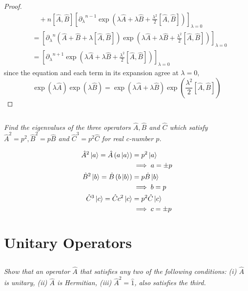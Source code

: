 \documentclass{article}
\begin{document}
\begin{proof}
\begin{align*}
        & \quad+n[\hat{A}, \hat{B}]\left[{\partial_\lambda}^{n-1 } \exp \left(\lambda \hat{A}+\lambda \hat{B}+\frac{\lambda^{2}}{2}[\hat{A}, \hat{B}]\right)\right]_{\lambda=0}\\
        &= \left[{\partial_\lambda}^{n }(\hat{A}+\hat{B}+\lambda[\hat{A}, \hat{B}]) \exp \left(\lambda \hat{A}+\lambda \hat{B}+\frac{\lambda^{2}}{2}[\hat{A}, \hat{B}]\right)\right]_{\lambda=0} \\ 
        &= \left[{\partial_\lambda}^{n + 1} \exp \left(\lambda \hat{A}+\lambda \hat{B}+\frac{\lambda^{2}}{2}[\hat{A}, \hat{B}]\right)\right]_{\lambda=0}
    \end{align*}
    since the equation and each term in its expansion agree at $\lambda = 0$, 
    $$
        \boxed{\exp(\lambda \hat{A}) \exp(\lambda \hat{B})=\exp \left(\lambda \hat{A}+\lambda \hat{B} \right)  \exp \left(\frac{\lambda^{2}}{2}[\hat{A}, \hat{B}]\right)}
    $$
\end{proof}


\subsection{}
\textit{Find the eigenvalues of the three operators $\hat{A}, \hat{B}$ and $\hat{C}$ which satisfy $\hat{A}^{2}=p^{2}, \hat{B}^{2}=p \hat{B}$ and $\hat{C}^{3}=p^{2} \hat{C}$ for real c-number $p$.}

\begin{align*}
    \hat{A}^2 \ket a = \hat{A} \left(a \ket a\right)  &= p ^2 \ket a \\
    &\implies a = \pm p \\
    \hat{B}^2 \ket b = \hat{B} \left(b \ket b \right)  &= p \hat{B} \ket b \\
     &\implies b = p \\
    \hat{C}^3 \ket c=\hat{C} c^2 \ket c  &= p^2 \hat{C} \ket c \\
     &\implies c = \pm p \\
\end{align*}

\newpage
\section{Unitary Operators}
\subsection{}
\textit{Show that an operator $\hat{A}$ that satisfies any two of the following conditions: (i) $\hat{A}$ is unitary, (ii) $\hat{A}$ is Hermitian, (iii) $\hat{A}^2 =\hat{1}$, also satisfies the third. }
\end{document}
